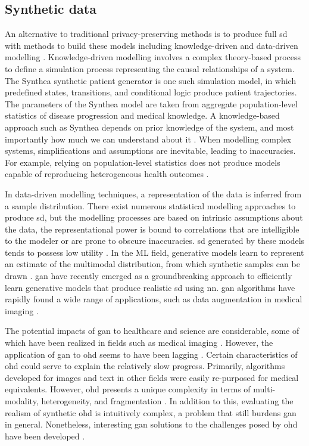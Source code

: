 \subsection{Synthetic data}
An alternative to traditional privacy-preserving methods is to produce full \gls{sd} with methods to build these models including knowledge-driven and data-driven modelling \cite{Kim_2017}. Knowledge-driven modelling involves a complex theory-based process to define a simulation process representing the causal relationships of a system. The Synthea \cite{Walonoski_2017} synthetic patient generator is one such simulation model, in which predefined states, transitions, and conditional logic produce patient trajectories. The parameters of the Synthea model are taken from aggregate population-level statistics of disease progression and medical knowledge. A knowledge-based approach such as Synthea depends on prior knowledge of the system, and most importantly how much we can understand about it \cite{Kim_2017}. When modelling complex systems, simplifications and assumptions are inevitable, leading to inaccuracies. For example, relying on population-level statistics does not produce models capable of reproducing heterogeneous health outcomes \cite{Chen_2019}.\par
In data-driven modelling techniques, a representation of the data is inferred from a sample distribution. There exist numerous statistical modelling approaches to produce \gls{sd}, but the modelling processes are based on intrinsic assumptions about the data, the representational power is bound to correlations that are intelligible to the modeler or are prone to obscure inaccuracies. \gls{sd} generated by these models tends to possess low utility \cite{Rankin2020}. In the ML field, generative models learn to represent an estimate of the multimodal distribution, from which synthetic samples can be drawn \cite{goodfellow2016nips}. \Gls{gan} \cite{NIPS2014_5423} have recently emerged as a groundbreaking approach to efficiently learn generative models that produce realistic \gls{sd} using \gls{nn}. \gls{gan} algorithms have rapidly found a wide range of applications, such as data augmentation in medical imaging \cite{Kadurin_2017}.\par
The potential impacts of \gls{gan} to healthcare and science are considerable, some of which have been realized in fields such as medical imaging \cite{Yi_2019}. However, the application of \gls{gan} to \gls{ohd} seems to have been lagging \cite{Xiao_2018_chall}. Certain characteristics of \gls{ohd} could serve to explain the relatively slow progress. Primarily, algorithms developed for images and text in other fields were easily re-purposed for medical equivalents. However, \gls{ohd} presents a unique complexity in terms of multi-modality, heterogeneity, and fragmentation \cite{Xiao_2018_chall}. In addition to this, evaluating the realism of synthetic \gls{ohd} is intuitively complex, a problem that still burdens \gls{gan} in general. Nonetheless, interesting \gls{gan} solutions to the challenges posed by \gls{ohd} have been developed \cite{esteban2017real,Che_2017,Choi2017-nt,yahi2017generative}.